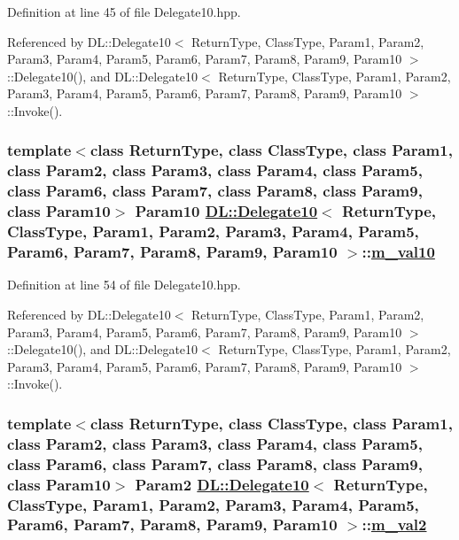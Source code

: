 Definition at line 45 of file Delegate10.hpp.

Referenced by DL::Delegate10$<$ Return\-Type, Class\-Type, Param1, Param2, Param3, Param4, Param5, Param6, Param7, Param8, Param9, Param10 $>$::Delegate10(), and DL::Delegate10$<$ Return\-Type, Class\-Type, Param1, Param2, Param3, Param4, Param5, Param6, Param7, Param8, Param9, Param10 $>$::Invoke().\hypertarget{classDL_1_1Delegate10_r11}{
\subsubsection[m\_\-val10]{\setlength{\rightskip}{0pt plus 5cm}template$<$class Return\-Type, class Class\-Type, class Param1, class Param2, class Param3, class Param4, class Param5, class Param6, class Param7, class Param8, class Param9, class Param10$>$ Param10 \hyperlink{classDL_1_1Delegate10}{DL::Delegate10}$<$ Return\-Type, Class\-Type, Param1, Param2, Param3, Param4, Param5, Param6, Param7, Param8, Param9, Param10 $>$::\hyperlink{classDL_1_1Delegate10_r11}{m\_\-val10}}}
\label{classDL_1_1Delegate10_r11}




Definition at line 54 of file Delegate10.hpp.

Referenced by DL::Delegate10$<$ Return\-Type, Class\-Type, Param1, Param2, Param3, Param4, Param5, Param6, Param7, Param8, Param9, Param10 $>$::Delegate10(), and DL::Delegate10$<$ Return\-Type, Class\-Type, Param1, Param2, Param3, Param4, Param5, Param6, Param7, Param8, Param9, Param10 $>$::Invoke().\hypertarget{classDL_1_1Delegate10_r3}{
\subsubsection[m\_\-val2]{\setlength{\rightskip}{0pt plus 5cm}template$<$class Return\-Type, class Class\-Type, class Param1, class Param2, class Param3, class Param4, class Param5, class Param6, class Param7, class Param8, class Param9, class Param10$>$ Param2 \hyperlink{classDL_1_1Delegate10}{DL::Delegate10}$<$ Return\-Type, Class\-Type, Param1, Param2, Param3, Param4, Param5, Param6, Param7, Param8, Param9, Param10 $>$::\hyperlink{classDL_1_1Delegate10_r3}{m\_\-val2}}}
\label{classDL_1_1Delegate10_r3}




